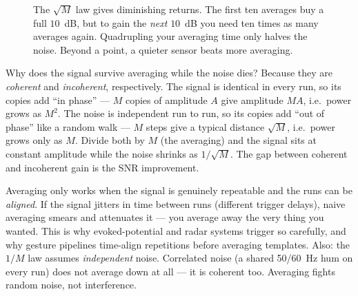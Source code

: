 \begin{figure}[H]
\centering
{}
\caption{The $\sqrt{M}$ law gives diminishing returns. The first ten averages buy
a full $10$~dB, but to gain the \emph{next} $10$~dB you need ten times as many
averages again. Quadrupling your averaging time only halves the noise. Beyond a
point, a quieter sensor beats more averaging.}
\label{ch20:fig-avg}
\end{figure}

\begin{happeningbox}
Why does the signal survive averaging while the noise dies? Because they are
\emph{coherent} and \emph{incoherent}, respectively. The signal is identical in
every run, so its copies add ``in phase'' --- $M$ copies of amplitude $A$ give
amplitude $MA$, i.e.\ power grows as $M^2$. The noise is independent run to run,
so its copies add ``out of phase'' like a random walk --- $M$ steps give a typical
distance $\sqrt{M}$, i.e.\ power grows only as $M$. Divide both by $M$ (the
averaging) and the signal sits at constant amplitude while the noise shrinks as
$1/\sqrt{M}$. The gap between coherent and incoherent gain is the SNR
improvement.
\end{happeningbox}

\begin{trapbox}
Averaging only works when the signal is genuinely repeatable and the runs can be
\emph{aligned}. If the signal jitters in time between runs (different trigger
delays), naive averaging smears and attenuates it --- you average away the very
thing you wanted. This is why evoked-potential and radar systems trigger so
carefully, and why gesture pipelines time-align repetitions before averaging
templates. Also: the $1/M$ law assumes \emph{independent} noise. Correlated noise
(a shared 50/60~Hz hum on every run) does not average down at all --- it is
coherent too. Averaging fights random noise, not interference.
\end{trapbox}

